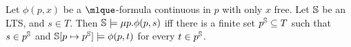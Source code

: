 \begin{proposition}\label{prop:cor_constructivity}
Let $\phi(p,x)$ be a $\mlque$-formula continuous in $p$ with only $x$
free. Let $\mathbb{S}$ be an LTS, and $s \in T$. Then
$\mathbb{S} \models \mu p. \phi(p,s)$ iff there is a finite set $p^{\mathbb{S}} \subseteq T$ such that $s\in p^{\mathbb{S}}$ and $\mathbb{S}[p\mapsto p^{\mathbb{S}}] \models \phi(p,t)$  for every $t \in p^{\mathbb{S}}$.
\end{proposition}
%
